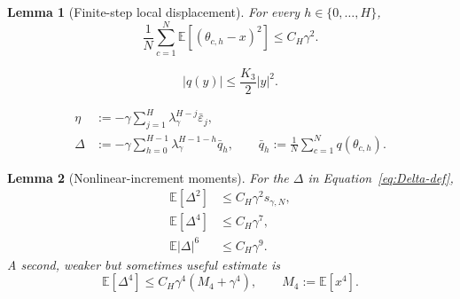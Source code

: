 \documentclass[10pt,a4paper]{amsart}
\newtheorem{lemma}{Lemma}
\newcommand{\E}{\mathbb{E}}
\newcommand{\eps}{\varepsilon}
\newcommand{\smallscale}{s_{\gamma,N}}
\begin{document}
\begin{lemma}[Finite-step local displacement]
\label{lem:displacement2}
For every $h\in\{0,\ldots,H\}$,
\begin{equation}
\label{eq:disp2}
  \frac1N\sum_{c=1}^N\E[(\theta_{c,h}-x)^2]\le C_H\gamma^2.
\end{equation}
\end{lemma}

\begin{equation}
\label{eq:q-quadratic}
  |q(y)|\le \frac{K_3}{2}|y|^2.
\end{equation}

\begin{align}
  \eta&:=-\gamma\sum_{j=1}^H\lambda_\gamma^{H-j}\bar\eps_j,             \label{eq:eta-def}\\
  \Delta&:=-\gamma\sum_{h=0}^{H-1}\lambda_\gamma^{H-1-h}\bar q_h,
  \qquad
  \bar q_h:=\frac1N\sum_{c=1}^N q(\theta_{c,h}).                         \label{eq:Delta-def}
\end{align}

\begin{lemma}[Nonlinear-increment moments]
\label{lem:Delta-moments}
For the $\Delta$ in Equation~\eqref{eq:Delta-def},
\begin{align}
  \E[\Delta^2]&\le C_H\gamma^2\smallscale,                              \label{eq:Delta2}\\
  \E[\Delta^4]&\le C_H\gamma^7,                                         \label{eq:Delta4-sharp}\\
  \E|\Delta|^6&\le C_H\gamma^9.                                         \label{eq:Delta6}
\end{align}
A second, weaker but sometimes useful estimate is
\begin{equation}
\label{eq:Delta4-M4}
  \E[\Delta^4]\le C_H\gamma^4(M_4+\gamma^4),
  \qquad M_4:=\E[x^4].
\end{equation}
\end{lemma}
\end{document}
